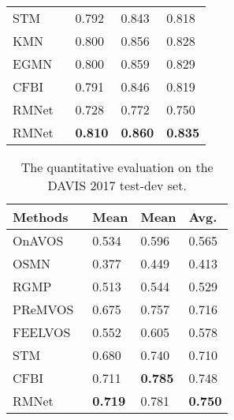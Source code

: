 \documentclass[final]{cvpr}
\begin{document}
\begin{table}
\begin{tabularx}{\linewidth}{lYYY}
STM ~\cite{DBLP:conf/iccv/OhLXK19}
                  & 0.792      & 0.843      & 0.818 \\
KMN ~\cite{DBLP:conf/eccv/SeongHK20}
                  & 0.800      & 0.856      & 0.828 \\
    EGMN ~\cite{DBLP:conf/eccv/LuWDZSG20} 
                  & 0.800      & 0.859      & 0.829 \\
CFBI ~\cite{DBLP:conf/eccv/YangWY20}
                  & 0.791      & 0.846      & 0.819 \\
    \midrule
    RMNet         & 0.728      & 0.772      & 0.750 \\
    RMNet  
                  & \bf{0.810} & \bf{0.860} & \bf{0.835} \\
    \bottomrule
  \end{tabularx}
  \label{tab:davis2017-val}
  \vspace{-2 mm}
\end{table}

\begin{table}
  \caption{The quantitative evaluation on the DAVIS 2017 test-dev set.}
  \vspace{.5 mm}
  \begin{tabularx}{\linewidth}{lYYY}
    \toprule
    Methods       &  Mean &  Mean
                  & Avg. \\
    \midrule
    OnAVOS~\cite{DBLP:conf/bmvc/VoigtlaenderL17}
                  & 0.534      & 0.596      & 0.565 \\
    OSMN~\cite{DBLP:conf/cvpr/YangWXYK18}
                  & 0.377      & 0.449      & 0.413 \\
    RGMP~\cite{DBLP:conf/cvpr/OhLSK18}
                  & 0.513      & 0.544      & 0.529 \\
    PReMVOS~\cite{DBLP:conf/accv/LuitenVL18}
                  & 0.675      & 0.757      & 0.716 \\
    FEELVOS~\cite{DBLP:conf/cvpr/VoigtlaenderCSA19}
                  & 0.552      & 0.605      & 0.578 \\
    STM~\cite{DBLP:conf/iccv/OhLXK19}
                  & 0.680      & 0.740      & 0.710 \\
    CFBI~\cite{DBLP:conf/eccv/YangWY20}
                  & 0.711      & \bf{0.785} & 0.748 \\
    \midrule
    RMNet         & \bf{0.719} & 0.781      & \bf{0.750} \\
    \bottomrule
  \end{tabularx}
  \label{tab:davis2017-test-dev}
  \vspace{-2 mm}
\end{table}
\end{document}

